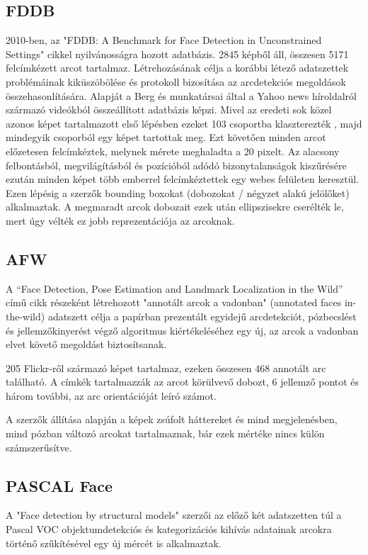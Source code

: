 \subsection{FDDB}
2010-ben, az "FDDB: A Benchmark for Face Detection in Unconstrained Settings" \cite{jain_fddb_2010} cikkel nyilvánosságra hozott adatbázis. 2845 képből áll, összesen 5171 felcímkézett arcot tartalmaz. Létrehozásának célja a korábbi létező adatszettek problémáinak kiküszöbölése és protokoll bizosítása az arcdetekciós megoldások összehasonlítására. Alapját a Berg és munkatársai által a Yahoo news 
híroldalról származó videókból összeállított adatbázis képzi. Mivel az eredeti sok közel azonos képet tartalmazott első lépésben ezeket 103 csoportba klaszterezték 
, 
majd mindegyik csoporból egy képet tartottak meg. Ezt követően minden arcot előzetesen felcímkéztek, melynek mérete meghaladta a 20 pixelt. Az alacsony felbontásból, megvilágításból és pozícióból adódó bizonytalanságok kiszűrésére ezután minden képet több emberrel felcímkéztettek egy webes felületen keresztül. Ezen lépésig a szerzők bounding boxokat (dobozokat / négyzet alakú jelölőket) alkalmaztak. A megmaradt arcok dobozait ezek után ellipszisekre cserélték le, mert úgy vélték ez jobb reprezentációja az arcoknak.

\subsection{AFW}
A “Face Detection, Pose Estimation and Landmark Localization in the Wild” \cite{zhu_face_2012} című cikk részeként létrehozott "annotált arcok a vadonban" (annotated faces in-the-wild) adatszett célja a papírban prezentált egyidejű arcdetekciót, pózbecslést és jellemzőkinyerést végző algoritmus kiértékeléséhez egy új, az arcok a vadonban elvet követő megoldást biztosítsanak.

205 Flickr-ről\cite{noauthor_flickr_nodate} származó képet tartalmaz, ezeken összesen 468 annotált arc található. A címkék tartalmazzák az arcot körülvevő dobozt, 6 jellemző pontot és három további, az arc orientációját leíró számot.

A szerzők állítása alapján a képek zsúfolt háttereket és mind megjelenésben, mind pózban változó arcokat tartalmaznak, bár ezek mértéke nincs külön számszerűsítve.

\subsection{PASCAL Face}
A "Face detection by structural models" \cite{yan_face_2014} szerzői az előző két adatszetten túl a Pascal VOC \cite{everingham_pascal_2010} objektumdetekciós és kategorizációs kihívás adatainak arcokra történő szűkítésével egy új mércét is alkalmaztak.

